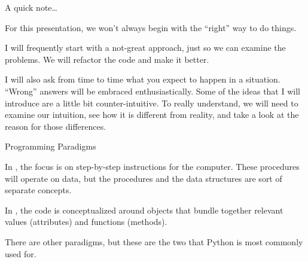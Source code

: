 \documentclass[aspectratio=149, handout] {beamer}
\begin{document}
\begin{frame}[fragile]{A quick note\dots}

  For this presentation, we won't always begin with the ``right'' way to do things.

  \medskip

  I will frequently start with a not-great approach, just so we can examine the problems.
  We will refactor the code and make it better.
  
  \medskip \pause
  
  I will also ask from time to time what you expect to happen in a situation.
  ``Wrong'' answers will be embraced enthusiastically.  
  Some of the ideas that I will introduce are a little bit counter-intuitive.
  To really understand, we will need to examine our intuition,
  see how it is different from reality, 
  and take a look at the reason for those differences. 

\end{frame}





\begin{frame}[fragile]{Programming Paradigms}

  In ,
  the focus is on step-by-step instructions for the computer.
  These procedures will operate on data, but the procedures 
  and the data structures are sort of separate concepts.

  \bigskip \pause

  In ,
  the code is conceptualized around objects 
  that bundle together relevant values (attributes) and functions (methods).

  \bigskip \pause

  There are other paradigms, but these are the two that Python is most commonly used for.

\end{frame}
\end{document}
